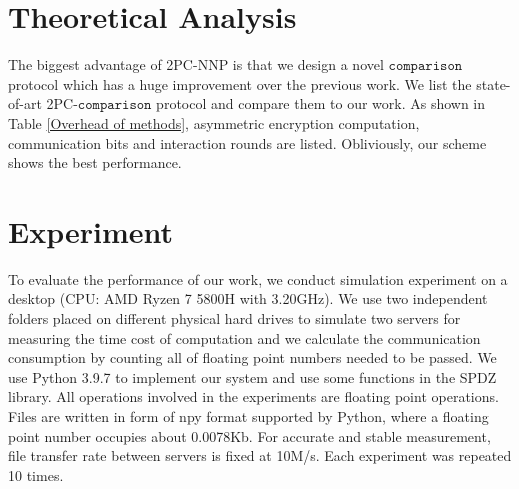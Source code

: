 \documentclass[letterpaper]{article} %
\begin{document}
    \section{Theoretical Analysis}
    \begin{table}[!ht]

        \center
        \caption{Overhead of different 2PC-comparison schemes for a $l$-bits value }
        \label{Overhead of methods}
    \end{table}
    The biggest advantage of 2PC-NNP is that we design a novel $\mathtt{comparison}$ protocol which has
    a huge improvement over the previous work.
    We list the state-of-art 2PC-$\mathtt{comparison}$ protocol and compare them to our work.
    As shown in Table \ref{Overhead of methods}, asymmetric encryption computation, communication bits and
    interaction rounds are listed.
    Obliviously, our scheme shows the best performance.

    \section{Experiment}
    To evaluate the performance of our work, we conduct simulation experiment on a desktop (CPU: AMD Ryzen 7 5800H with 3.20GHz).
    We use two independent folders placed on different physical hard drives to simulate
    two servers for measuring the time cost of computation
    and we calculate the communication consumption by counting all of floating point numbers needed to be passed.
    We use Python 3.9.7 to implement our system and use some functions in the SPDZ library.
    All operations involved in the experiments are floating point operations.
    Files are written in form of npy format supported by Python, where a floating point number occupies about 0.0078Kb.
    For accurate and stable measurement, file transfer rate between servers is fixed at 10M/s.
    Each experiment was repeated 10 times.
\end{document}
